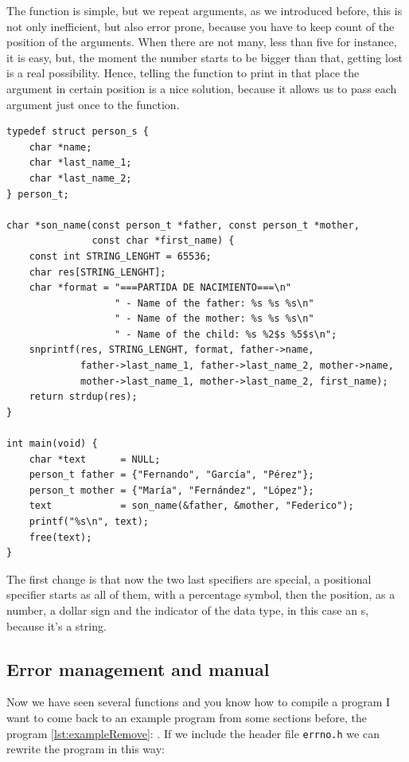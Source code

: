\documentclass[a4paper]{article}
\begin{document}
The function is simple, but we repeat arguments, as we introduced before,
this is not only inefficient, but also error prone, because you have to keep
count of the position of the arguments. When there are not many, less than five
for instance, it is easy, but, the moment the number starts to be bigger than
that, getting lost is a real possibility. Hence, telling the function
to print in that place the argument in certain position is a nice solution,
because it allows us to pass each argument just once to the function.

\noindent
\begin{minipage}[H]{\linewidth}
\mbox{}
\begin{lstlisting}[style=C,
caption={Example of positional specifier},
label={lst:repeatedMessagesPos}]
typedef struct person_s {
    char *name;
    char *last_name_1;
    char *last_name_2;
} person_t;

char *son_name(const person_t *father, const person_t *mother,
               const char *first_name) {
    const int STRING_LENGHT = 65536;
    char res[STRING_LENGHT];
    char *format = "===PARTIDA DE NACIMIENTO===\n"
                   " - Name of the father: %s %s %s\n"
                   " - Name of the mother: %s %s %s\n"
                   " - Name of the child: %s %2$s %5$s\n";
    snprintf(res, STRING_LENGHT, format, father->name,
             father->last_name_1, father->last_name_2, mother->name,
             mother->last_name_1, mother->last_name_2, first_name);
    return strdup(res);
}

int main(void) {
    char *text      = NULL;
    person_t father = {"Fernando", "García", "Pérez"};
    person_t mother = {"María", "Fernández", "López"};
    text            = son_name(&father, &mother, "Federico");
    printf("%s\n", text);
    free(text);
}
\end{lstlisting}
\end{minipage}

The first change is that now the two last specifiers are special, a positional
specifier starts as all of them, with a percentage symbol, then the position, as
a number, a dollar sign and the indicator of the data type, in this case an
s, because it's a string.

\subsection{Error management and manual}
Now we have seen several functions and you know how to compile a program I want
to come back to an example program from some sections before, the program
\ref{lst:exampleRemove}: . If we include the header
file \verb!errno.h! we can rewrite the program in this way:
\end{document}
